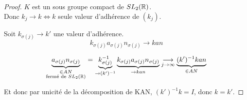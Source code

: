 \begin{proof}
$K$ est un sous groupe compact de $SL_2(\mathbb{R})$. \\
Donc $k_j \to k \iff k$ seule valeur d'adhérence de $(k_j)$.

Soit $k_{\sigma(j)} \to k'$ une valeur d'adhérence.
\[ k_{\sigma(j)} a_{\sigma(j)} n_{\sigma(j)} \to k a n \]

\[ 
    \underbrace{a_{\sigma(j)} n_{\sigma(j)}}_{\substack{\in AN \\ \text{fermé de } SL_2(\mathbb{R})}} = 
    \underbrace{k_{\sigma(j)}^{-1}}_{\to (k')^{-1}} 
    \underbrace{k_{\sigma(j)} a_{\sigma(j)} n_{\sigma(j)}}_{\to k a n} 
    \underset{j \to \infty}{\longrightarrow} 
    \underbrace{(k')^{-1} k a n}_{\in AN} 
\]

Et donc par unicité de la décomposition de KAN, $(k')^{-1} k = I$, donc $k = k'$.
\end{proof}
